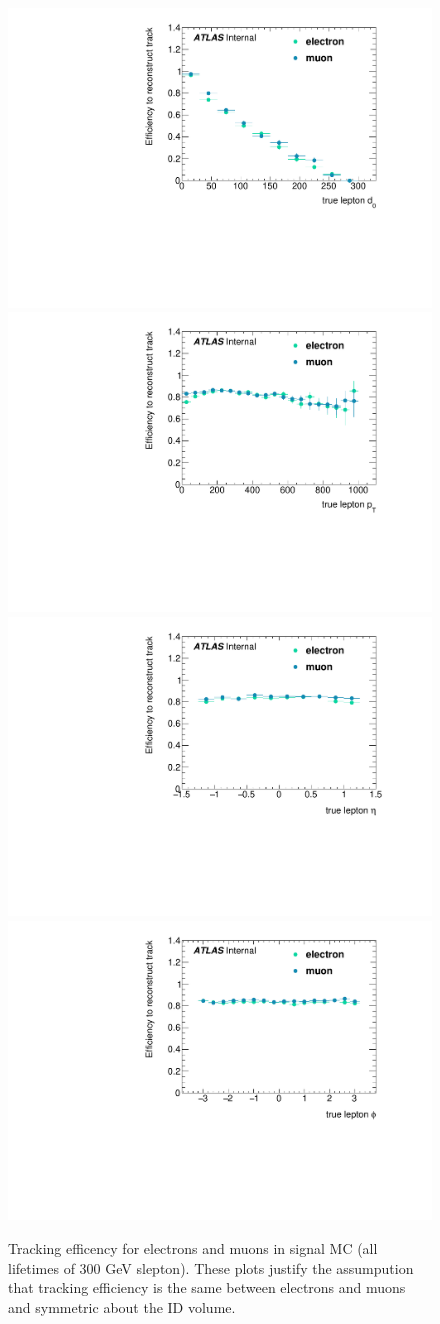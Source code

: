 \begin{figure}[htbp]
\centering
\includegraphics[width=.48\textwidth]{figures/LRT_systs/stlrt_compare_elmu_d0.pdf}
\includegraphics[width=.48\textwidth]{figures/LRT_systs/stlrt_compare_elmu_pt.pdf}
\includegraphics[width=.48\textwidth]{figures/LRT_systs/stlrt_compare_elmu_eta.pdf}
\includegraphics[width=.48\textwidth]{figures/LRT_systs/stlrt_compare_elmu_phi.pdf}
\caption{Tracking efficency for electrons and muons in signal MC (all lifetimes of 300 GeV slepton). These plots justify the assumpution that tracking efficiency is the same between electrons and muons and symmetric about the \ac{ID} volume.}
\label{fig:trk_el_mu}
\end{figure}


